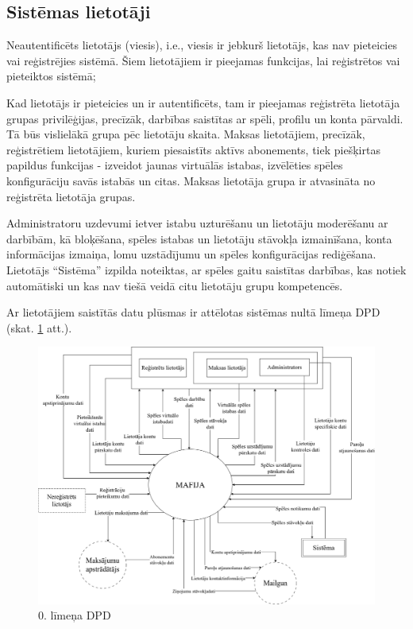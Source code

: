 \subsection{Sistēmas lietotāji}

Neautentificēts lietotājs (viesis), i.e., viesis ir jebkurš lietotājs, kas nav
pieteicies vai reģistrējies sistēmā. Šiem lietotājiem ir pieejamas funkcijas,
lai reģistrētos vai pieteiktos sistēmā;

Kad lietotājs ir pieteicies un ir autentificēts, tam ir pieejamas reģistrēta
lietotāja grupas privilēģijas, precīzāk, darbības saistītas ar spēli, profilu
un konta pārvaldi. Tā būs vislielākā grupa pēc lietotāju skaita. Maksas
lietotājiem, precīzāk, reģistrētiem lietotājiem, kuriem piesaistīts aktīvs
abonements, tiek piešķirtas papildus funkcijas - izveidot jaunas virtuālās
istabas, izvēlēties spēles konfigurāciju savās istabās un citas. Maksas
lietotāja grupa ir atvasināta no reģistrēta lietotāja grupas.

Administratoru uzdevumi ietver istabu uzturēšanu un  lietotāju moderēšanu ar
darbībām, kā bloķēšana, spēles istabas un lietotāju stāvokļa izmainīšana, konta
informācijas izmaiņa, lomu uzstādījumu un spēles konfigurācijas rediģēšana.
Lietotājs ``Sistēma'' izpilda noteiktas, ar spēles gaitu saistītas darbības, kas
notiek automātiski un kas nav tiešā veidā citu lietotāju grupu kompetencēs.

Ar lietotājiem saistītās datu plūsmas ir attēlotas sistēmas nultā līmeņa DPD (skat. \ref{fig:dpd-0} att.).


\begin{figure}[htbp]
	\centering
	\includegraphics[width=\linewidth]{./src/img/0tāLīmeņaDPD.png}
	\caption{0. līmeņa DPD}
	\label{fig:dpd-0}
\end{figure}

